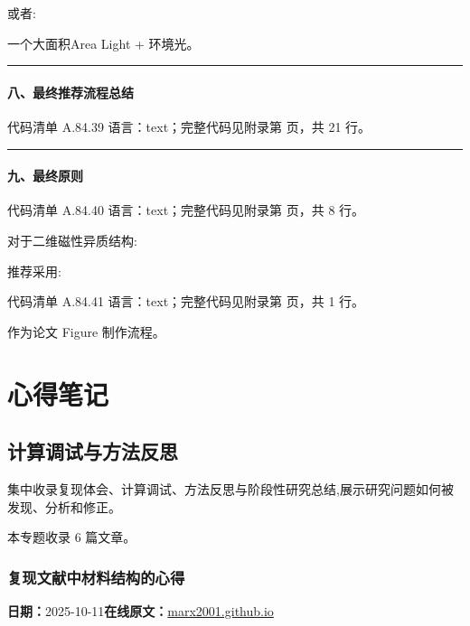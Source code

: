 \documentclass[lang=cn,scheme=chinese,color=blue,device=normal,toc=onecol,math=cm]{elegantbook}
\begin{document}
或者:\par


一个大面积Area Light + 环境光。\par


\medskip\hrule\medskip


\subsection{八、最终推荐流程总结}


\begin{codeindexbox}{代码清单 A.84.39}
语言：text；完整代码见附录第 \pageref{code:84:39} 页，共 21 行。
\end{codeindexbox}


\medskip\hrule\medskip


\subsection{九、最终原则}


\begin{codeindexbox}{代码清单 A.84.40}
语言：text；完整代码见附录第 \pageref{code:84:40} 页，共 8 行。
\end{codeindexbox}


对于二维磁性异质结构:\par


推荐采用:\par


\begin{codeindexbox}{代码清单 A.84.41}
语言：text；完整代码见附录第 \pageref{code:84:41} 页，共 1 行。
\end{codeindexbox}


作为论文 Figure 制作流程。\par


\part{心得笔记}
\chapter{计算调试与方法反思}
\begin{partbox}集中收录复现体会、计算调试、方法反思与阶段性研究总结,展示研究问题如何被发现、分析和修正。\par\medskip 本专题收录 6 篇文章。\end{partbox}

\section{复现文献中材料结构的心得}
\begin{articlemeta}
\textbf{日期：}2025-10-11\hfill\textbf{在线原文：}\href{https://marx2001.github.io/sci-note\_posts/20251011-F}{marx2001.github.io}
\end{articlemeta}
\end{document}
